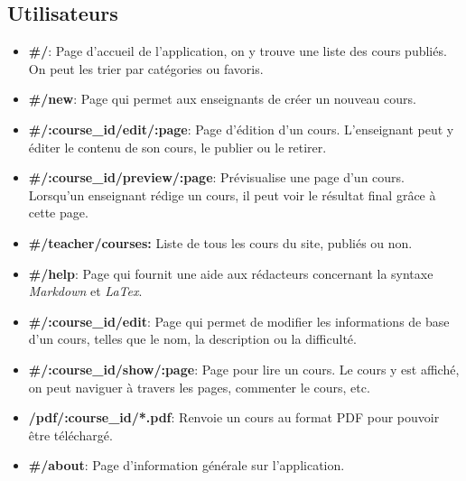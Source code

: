 \documentclass[letterpaper,10pt,oneside]{sphinxmanual}
\begin{document}
\subsection{Utilisateurs}
\label{guide:utilisateurs}\begin{itemize}
\item {} 
\textbf{\#/}: Page d'accueil de l'application, on y trouve une liste des cours publiés. On peut les trier par catégories ou favoris.

\item {} 
\textbf{\#/new}: Page qui permet aux enseignants de créer un nouveau cours.

\item {} 
\textbf{\#/:course\_id/edit/:page}: Page d'édition d'un cours. L'enseignant peut y éditer le contenu de son cours, le publier ou le retirer.

\item {} 
\textbf{\#/:course\_id/preview/:page}: Prévisualise une page d'un cours. Lorsqu'un enseignant rédige un cours, il peut voir le résultat final grâce à cette page.

\item {} 
\textbf{\#/teacher/courses:} Liste de tous les cours du site, publiés ou non.

\item {} 
\textbf{\#/help}: Page qui fournit une aide aux rédacteurs concernant la syntaxe \emph{Markdown} et \emph{LaTex}.

\item {} 
\textbf{\#/:course\_id/edit}: Page qui permet de modifier les informations de base d'un cours, telles que le nom, la description ou la difficulté.

\item {} 
\textbf{\#/:course\_id/show/:page}: Page pour lire un cours. Le cours y est affiché, on peut naviguer à travers les pages, commenter le cours, etc.

\item {} 
\textbf{/pdf/:course\_id/*.pdf}: Renvoie un cours au format PDF pour pouvoir être téléchargé.

\item {} 
\textbf{\#/about}: Page d'information générale sur l'application.

\end{itemize}
\end{document}
